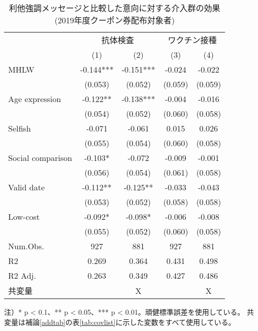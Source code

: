\documentclass[
  11pt,
  a4paper,
]{article}
\begin{document}
\begin{table}

\caption{\label{tab:show-int-coupon1-altreg}利他強調メッセージと比較した意向に対する介入群の効果 (2019年度クーポン券配布対象者)}
\centering
\begin{threeparttable}
\begin{tabular}[t]{lcccc}
\toprule
\multicolumn{1}{c}{ } & \multicolumn{2}{c}{抗体検査} & \multicolumn{2}{c}{ワクチン接種} \\
\cmidrule(l{3pt}r{3pt}){2-3} \cmidrule(l{3pt}r{3pt}){4-5}
  & (1) & (2) & (3) & (4)\\
\midrule
MHLW & -0.144*** & -0.151*** & -0.024 & -0.022\\
 & (0.053) & (0.052) & (0.059) & (0.059)\\
Age expression & -0.122** & -0.138*** & -0.004 & -0.016\\
 & (0.054) & (0.052) & (0.060) & (0.058)\\
Selfish & -0.071 & -0.061 & 0.015 & 0.026\\
 & (0.055) & (0.054) & (0.060) & (0.058)\\
Social comparison & -0.103* & -0.072 & -0.009 & -0.001\\
 & (0.056) & (0.054) & (0.061) & (0.058)\\
Valid date & -0.112** & -0.125** & -0.033 & -0.043\\
 & (0.053) & (0.052) & (0.058) & (0.058)\\
Low-cost & -0.092* & -0.098* & -0.006 & -0.008\\
 & (0.055) & (0.052) & (0.060) & (0.058)\\
\midrule
Num.Obs. & 927 & 881 & 927 & 881\\
R2 & 0.269 & 0.364 & 0.431 & 0.498\\
R2 Adj. & 0.263 & 0.349 & 0.427 & 0.486\\
共変量 &  & X &  & X\\
\bottomrule
\end{tabular}
\begin{tablenotes}
\item 注）* p < 0.1、** p < 0.05、*** p < 0.01。頑健標準誤差を使用している。 共変量は補論\ref{addtab}の表\ref{tab:covlist}に示した変数をすべて使用している。
\end{tablenotes}
\end{threeparttable}
\end{table}
\end{document}
